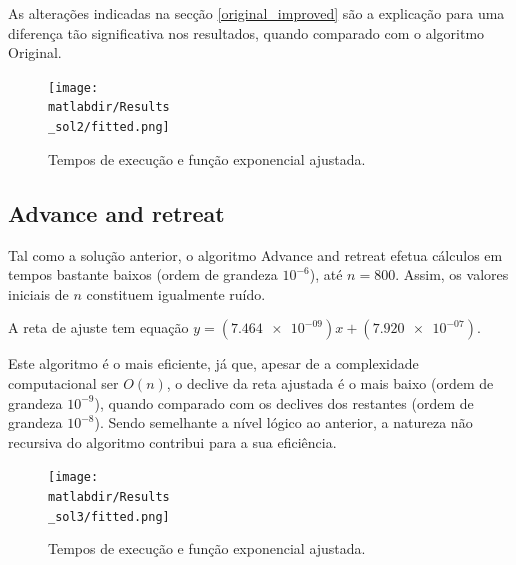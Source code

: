 \documentclass[portuguese,11pt,a4paper,titlepage]{article}
\newcommand{\matlabdir}{"../MATLAB-fittings"}
\begin{document}
As alterações indicadas na secção \autoref{original_improved} são a explicação para uma diferença tão significativa nos resultados,
quando comparado com o algoritmo Original.

\begin{figure}[h]
	\centering
	\texttt{[image: \\matlabdir/Results\\\_sol2/fitted.png]}
	\caption{Tempos de execução e função exponencial ajustada.}
	\label{fig:sol2}
\end{figure}
\pagebreak

\subsection{Advance and retreat}
Tal como a solução anterior, o algoritmo Advance and retreat efetua cálculos em tempos bastante baixos
(ordem de grandeza \begin{math}10^{-6}\end{math}), até \begin{math}n = 800\end{math}.
Assim, os valores iniciais de \begin{math}n\end{math} constituem igualmente ruído.

A reta de ajuste tem equação \begin{math}y=(\num{7.464e-09})x+(\num{7.920e-07})\end{math}.

Este algoritmo é o mais eficiente, já que, apesar de a complexidade computacional ser \begin{math}O(n)\end{math},
o declive da reta ajustada é o mais baixo (ordem de grandeza \begin{math}10^{-9}\end{math}), quando comparado com os
declives dos restantes (ordem de grandeza \begin{math}10^{-8}\end{math}).
Sendo semelhante a nível lógico ao anterior, a natureza não recursiva do algoritmo contribui para a sua eficiência.

\begin{figure}[h]
	\centering
	\texttt{[image: \\matlabdir/Results\\\_sol3/fitted.png]}
	\caption{Tempos de execução e função exponencial ajustada.}
	\label{fig:sol3}
\end{figure}
\end{document}
